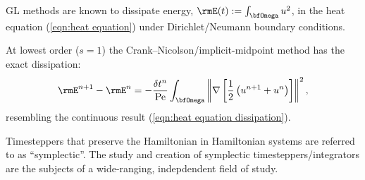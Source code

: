     \line
    
    \begin{example}
        GL methods are known to dissipate energy, $\rmE(t)  :=  \int_{\bfOmega}u^{2}$, in the heat equation (\ref{eqn:heat equation}) under Dirichlet/Neumann boundary conditions. \BA{[Ref]}
        
        At lowest order ($s  =  1$) the Crank--Nicolson/implicit-midpoint method has the exact dissipation:
        \begin{equation}\label{eqn:heat equation dissipation implicit midpoint}
            \rmE^{n + 1} - \rmE^{n}  =  - \frac{\delta t^{n}}{\rmPe}\int_{\bfOmega}\left\|\nabla\left[\frac{1}{2}\left(u^{n + 1} + u^{n}\right)\right]\right\|^{2},
        \end{equation}
        resembling the continuous result (\ref{eqn:heat equation dissipation}).
    \end{example}
    
    \begin{example}
        Timesteppers that preserve the Hamiltonian in Hamiltonian systems are referred to as ``symplectic''. The study and creation of symplectic timesteppers/integrators are the subjects of a wide-ranging, indepdendent field of study. \BA{[Ref]}
    \end{example}
    \line

    